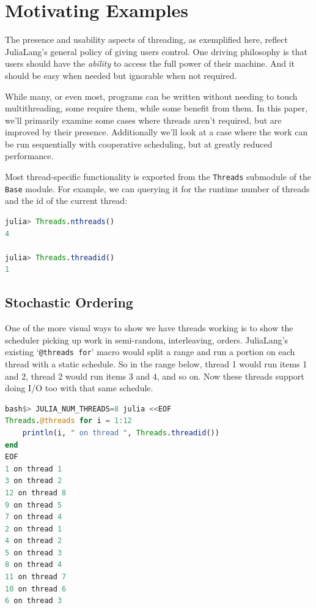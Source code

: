 \documentclass{juliacon}
\begin{document}
\section{Motivating Examples}
\label{subsub:motivation}

The presence and usability aspects of threading, as exemplified here, reflect JuliaLang's general policy of giving users control. One driving philosophy is that users should have the \textit{ability} to access the full power of their machine. And it should be easy when needed but ignorable when not required.

While many, or even most, programs can be written without needing to touch multithreading, some require them, while some benefit from them. In this paper, we'll primarily examine some cases where threads aren't required, but are improved by their presence. Additionally we'll look at a case where the work can be run sequentially with cooperative scheduling, but at greatly reduced performance.

Most thread-specific functionality is exported from the \verb|Threads| submodule of the \verb|Base| module. For example, we can querying it for the runtime number of threads and the id of the current thread:

\begin{lstlisting}[language = Julia]
julia> Threads.nthreads()
4

julia> Threads.threadid()
1
\end{lstlisting}

\subsection{Stochastic Ordering}
\label{subsub:pprint}

One of the more visual ways to show we have threads working is to show the scheduler picking up work in semi-random, interleaving, orders. JuliaLang's existing `\verb|@threads for|' macro would split a range and run a portion on each thread with a static schedule. So in the range below, thread 1 would run items 1 and 2, thread 2 would run items 3 and 4, and so on. Now these threads support doing I/O too with that same schedule.

\begin{lstlisting}[language = Julia]
bash$> JULIA_NUM_THREADS=8 julia <<EOF
Threads.@threads for i = 1:12
    println(i, " on thread ", Threads.threadid())
end
EOF
1 on thread 1
3 on thread 2
12 on thread 8
9 on thread 5
7 on thread 4
2 on thread 1
4 on thread 2
5 on thread 3
8 on thread 4
11 on thread 7
10 on thread 6
6 on thread 3
\end{lstlisting}
\end{document}
